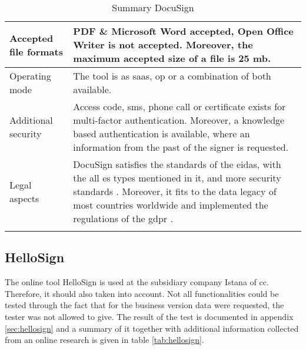 \begin{longtable}{|p{4cm}|p{10cm}|}
		Accepted file formats & PDF \& Microsoft Word accepted, Open Office Writer is not accepted. Moreover, the maximum accepted size of a file is 25 \gls{mb}. \parencite{docusign2018formats}\\ \hline
		Operating mode & The tool is as \gls{saas}, \gls{op} or a combination of both available. \parencite{docusign2018op,docusign2018saas} \\ \hline
		Additional security & Access code, \gls{sms}, phone call or certificate exists for multi-factor authentication. Moreover, a knowledge based authentication is available, where an information from the past of the signer is requested. \parencite{docusign2018security} \\ \hline
		Legal aspects & DocuSign satisfies the standards of the \gls{eidas}, with the all \gls{es} types mentioned in it, and more security standards \parencite{docusign2018certificates,docusign2018legal,docusign2018es}. Moreover, it fits to the data legacy of most countries worldwide and implemented the regulations of the \gls{gdpr} \parencite{docusign2018global, docusign2018gdpr}. \\ \hline
	\caption{Summary DocuSign}
	\label{tab:docusign}
	\end{longtable}


\subsection{HelloSign}
The online tool HelloSign is used at the subsidiary company Istana of \gls{cc}. Therefore, it should also taken into account. Not all functionalities could be tested through the fact that for the business version data were requested, the tester was not allowed to give. The result of the test is documented in appendix \ref{sec:hellosign} and a summary of it together with additional information collected from an online research is given in table \ref{tab:hellosign}.
	
